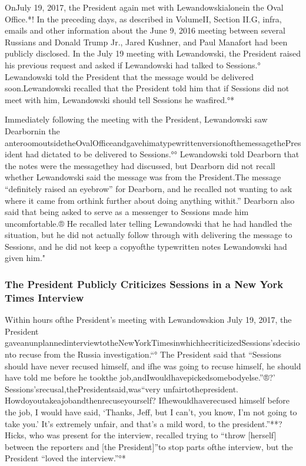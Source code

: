 {OnJuly 19, 2017, the President again met with Lewandowskialonein the Oval Office.*! In the preceding days, as described in VolumeII, Section II.G, infra, emails and other information about the June 9, 2016 meeting between several Russians and Donald Trump Jr., Jared Kushner, and Paul Manafort had been publicly disclosed. In the July 19 meeting with Lewandowski, the President raised his previous request and asked if Lewandowski had talked to Sessions.° Lewandowski told the President that the message would be delivered soon.Lewandowski recalled that the President told him that if Sessions did not meet with him, Lewandowski should tell Sessions he wasfired.°*

Immediately following the meeting with the President, Lewandowski saw Dearbornin the anteroomoutsidetheOvalOfficeandgavehimatypewrittenversionofthemessagethePresident had dictated to be delivered to Sessions.°° Lewandowski told Dearborn that the notes were the messagethey had discussed, but Dearborn did not recall whether Lewandowski said the message was from the President.The message “definitely raised an eyebrow” for Dearborn, and he recalled not wanting to ask where it came from orthink further about doing anything withit.” Dearborn also said that being asked to serve as a messenger to Sessions made him uncomfortable.® He recalled later telling Lewandowski that he had handled the situation, but he did not actually follow through with delivering the message to Sessions, and he did not keep a copyofthe typewritten notes Lewandowski had given him."

\subsubsection{The President Publicly Criticizes Sessions in a New York Times Interview}

Within hours ofthe President’s meeting with Lewandowskion July 19, 2017, the President gaveanunplannedinterviewtotheNewYorkTimesinwhichhecriticizedSessions’sdecisionto recuse from the Russia investigation.“° The President said that “Sessions should have never recused himself, and ifhe was going to recuse himself, he should have told me before he tookthe
job,andIwouldhavepickedsomebodyelse.”®?' Sessions’srecusal,thePresidentsaid,was“very unfairtothepresident. Howdoyoutakeajobandthenrecuseyourself? Ifhewouldhaverecused himself before the job, I would have said, ‘Thanks, Jeff, but I can’t, you know, I’m not going to take you.’ It’s extremely unfair, and that’s a mild word, to the president.”**? Hicks, who was present for the interview, recalled trying to “throw [herself] between the reporters and [the President]”to stop parts ofthe interview, but the President “loved the interview.”°*

}
